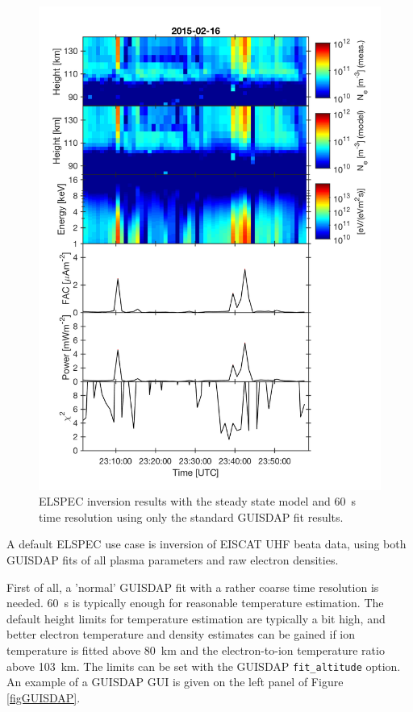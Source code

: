\documentclass[12pt,a4paper]{report}
\begin{document}
\begin{figure}[ht]
\begin{center}
\includegraphics[width=\textwidth]{ElSpec_20150216T230130-20150216T235900_beata_uhf_Fang_SheehanGr_equilibrium_1_1_dump.png}
\caption{ELSPEC inversion results with the steady state model and 60~s time resolution using only the standard GUISDAP fit results.}
\label{figElSpecOutEquilibrium60s}
\end{center}
\end{figure}

A default ELSPEC use case is inversion of EISCAT UHF beata data, using both GUISDAP fits of all plasma parameters and raw electron densities. 

First of all, a 'normal' GUISDAP fit with a rather coarse time resolution is needed. 60~s is typically enough for reasonable temperature estimation. The default height limits for temperature estimation are typically a bit high, and better electron temperature and density estimates can be gained if ion temperature is fitted above 80~km and the electron-to-ion temperature ratio above 103~km. The limits can be set with the GUISDAP \verb|fit_altitude| option. An example of a GUISDAP GUI is given on the left panel of Figure \ref{figGUISDAP}.
\end{document}
